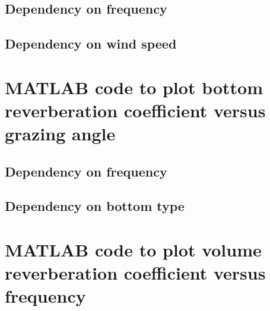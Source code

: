 \subsection{ Dependency on frequency } \label{ Dependency on frequency } 



\subsection{ Dependency on wind speed } \label{ Dependency on wind speed } 


\newpage

\section{ MATLAB code to plot bottom reverberation coefficient versus grazing angle } \label{ MATLAB code to plot bottom reverberation coefficient versus grazing angle }

\subsection{ Dependency on frequency } \label{ Dependency on frequency } 


\subsection{ Dependency on bottom type } \label{ Dependency on bottom type } 


\newpage

\section{ MATLAB code to plot volume reverberation coefficient versus frequency } \label{ MATLAB code to plot volume reverberation coefficient versus frequency }

